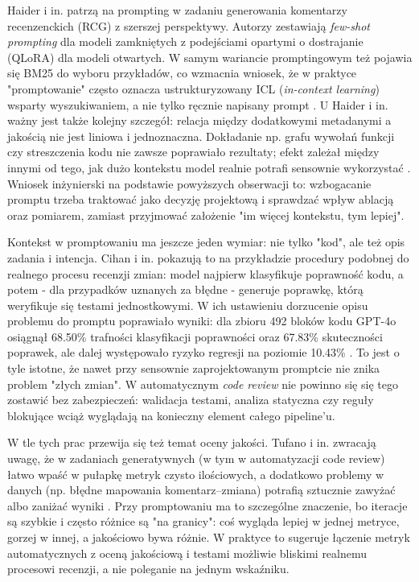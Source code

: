 Haider i in. patrzą na prompting w zadaniu generowania komentarzy recenzenckich (RCG) z szerszej perspektywy.
Autorzy zestawiają \emph{few-shot prompting} dla modeli zamkniętych z podejściami opartymi 
o dostrajanie (QLoRA) dla modeli otwartych. W samym wariancie promptingowym też pojawia 
się BM25 do wyboru przykładów, co wzmacnia wniosek, że w praktyce "promptowanie" 
często oznacza ustrukturyzowany ICL (\emph{in-context learning}) wsparty wyszukiwaniem, a nie tylko ręcznie napisany prompt 
\cite{Haider2024PromptingFineTuningRCG}. U Haider i in. ważny jest także kolejny szczegół: relacja między dodatkowymi metadanymi 
a jakością nie jest liniowa i jednoznaczna. Dokładanie np. grafu wywołań funkcji czy streszczenia 
kodu nie zawsze poprawiało rezultaty; efekt zależał między innymi od tego, jak 
dużo kontekstu model realnie potrafi sensownie wykorzystać \cite{Haider2024PromptingFineTuningRCG}.
Wniosek inżynierski na podstawie powyższych obserwacji to: wzbogacanie promptu trzeba traktować jako decyzję projektową i sprawdzać wpływ 
ablacją oraz pomiarem, zamiast przyjmować założenie "im więcej kontekstu, tym lepiej".

Kontekst w promptowaniu ma jeszcze jeden wymiar: nie tylko "kod", ale też 
opis zadania i intencja. Cihan i in. pokazują to na przykładzie procedury 
podobnej do realnego procesu recenzji zmian: model najpierw klasyfikuje poprawność kodu, a 
potem - dla przypadków uznanych za błędne - generuje poprawkę, którą weryfikuje 
się testami jednostkowymi. W ich ustawieniu dorzucenie opisu problemu do promptu poprawiało 
wyniki: dla zbioru 492 bloków kodu GPT-4o osiągnął 68.50\% trafności klasyfikacji poprawności 
oraz 67.83\% skuteczności poprawek, ale dalej występowało ryzyko regresji na poziomie 10.43\% 
\cite{Cihan2025EvaluatingLLMsForCodeReview}. To jest o tyle istotne, że nawet przy sensownie zaprojektowanym promptcie 
nie znika problem "złych zmian". W automatycznym \emph{code review} nie powinno się 
się tego zostawić bez zabezpieczeń: walidacja testami, analiza statyczna czy reguły blokujące 
wciąż wyglądają na konieczny element całego pipeline'u.

W tle tych prac przewija się też temat oceny jakości. Tufano i 
in. zwracają uwagę, że w zadaniach generatywnych (w tym w automatyzacji code 
review) łatwo wpaść w pułapkę metryk czysto ilościowych, a dodatkowo problemy w 
danych (np. błędne mapowania komentarz--zmiana) potrafią sztucznie zawyżać albo zaniżać wyniki \cite{Tufano2024CodeReviewAutomation}. 
Przy promptowaniu ma to szczególne znaczenie, bo iteracje są szybkie i często 
różnice są "na granicy": coś wygląda lepiej w jednej metryce, gorzej w 
innej, a jakościowo bywa różnie. W praktyce to sugeruje łączenie metryk automatycznych 
z oceną jakościową i testami możliwie bliskimi realnemu procesowi recenzji, a nie 
poleganie na jednym wskaźniku.

